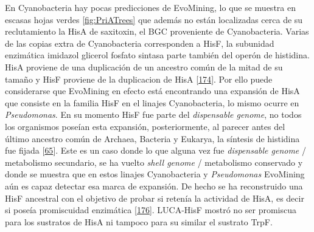 \documentclass[12pt,twoside]{reedthesis}
\begin{document}
  En Cyanobacteria hay pocas predicciones de EvoMining, lo que se muestra
  en escasas hojas verdes \autoref{fig:PriATrees} que además no están
  localizadas cerca de su reclutamiento la HisA de saxitoxin, el BGC
  proveniente de Cyanobacteria. Varias de las copias extra de
  Cyanobacteria corresponden a HisF, la subunidad enzimática imidazol
  glicerol fosfato sintasa parte también del operón de histidina. HisA
  proviene de una duplicación de un ancestro común de la mitad de su
  tamaño y HisF proviene de la duplicacion de HisA
  {[}\protect\hyperlink{ref-fani_evolution_1994}{174}{]}. Por ello puede
  considerarse que EvoMining en efecto está encontrando una expansión de
  HisA que consiste en la familia HisF en el linajes Cyanobacteria, lo
  mismo ocurre en \emph{Pseudomonas}. En su momento HisF fue parte del
  \emph{dispensable genome}, no todos los organismos poseían esta
  expansión, posteriormente, al parecer antes del último ancestro común de
  Archaea, Bacteria y Eukarya, la síntesis de histidina fue fijada
  {[}\protect\hyperlink{ref-fondi_evolution_2009}{65}{]}. Este es un caso
  donde lo que alguna vez fue \emph{dispensable genome} / metabolismo
  secundario, se ha vuelto \emph{shell genome} / metabolismo conservado y
  donde se muestra que en estos linajes Cyanobacteria y \emph{Pseudomonas}
  EvoMining aún es capaz detectar esa marca de expansión. De hecho se ha
  reconstruido una HisF ancestral con el objetivo de probar si retenía la
  actividad de HisA, es decir si poseía promiscuidad enzimática
  {[}\protect\hyperlink{ref-merkl_reconstruction_2016}{176}{]}. LUCA-HisF
  mostró no ser promiscua para los sustratos de HisA ni tampoco para su
  similar el sustrato TrpF.
  
\end{document}
